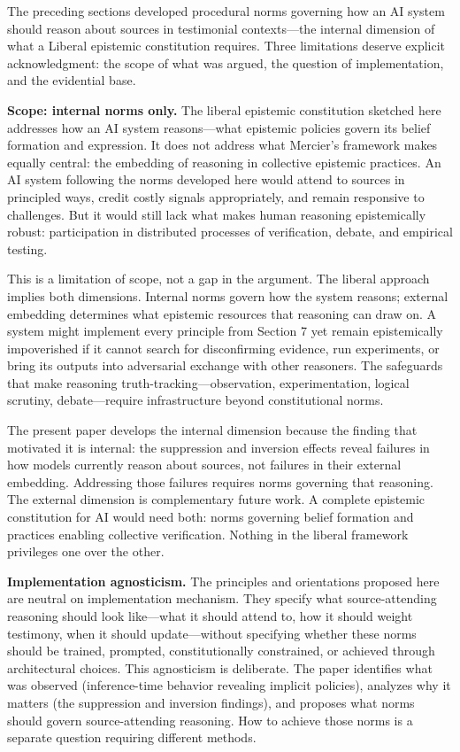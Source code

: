 The preceding sections developed procedural norms governing how an AI
system should reason about sources in testimonial contexts---the
internal dimension of what a Liberal epistemic constitution requires.
Three limitations deserve explicit acknowledgment: the scope of what was
argued, the question of implementation, and the evidential base.

\textbf{Scope: internal norms only.} The liberal epistemic constitution
sketched here addresses how an AI system reasons---what epistemic
policies govern its belief formation and expression. It does not address
what Mercier's framework makes equally central: the embedding of
reasoning in collective epistemic practices. An AI system following the
norms developed here would attend to sources in principled ways, credit
costly signals appropriately, and remain responsive to challenges. But
it would still lack what makes human reasoning epistemically robust:
participation in distributed processes of verification, debate, and
empirical testing.

This is a limitation of scope, not a gap in the argument. The liberal
approach implies both dimensions. Internal norms govern how the system
reasons; external embedding determines what epistemic resources that
reasoning can draw on. A system might implement every principle from
Section 7 yet remain epistemically impoverished if it cannot search for
disconfirming evidence, run experiments, or bring its outputs into
adversarial exchange with other reasoners. The safeguards that make
reasoning truth-tracking---observation, experimentation, logical
scrutiny, debate---require infrastructure beyond constitutional norms.

The present paper develops the internal dimension because the finding
that motivated it is internal: the suppression and inversion effects
reveal failures in how models currently reason about sources, not
failures in their external embedding. Addressing those failures requires
norms governing that reasoning. The external dimension is complementary
future work. A complete epistemic constitution for AI would need both:
norms governing belief formation and practices enabling collective
verification. Nothing in the liberal framework privileges one over the
other.

\textbf{Implementation agnosticism.} The principles and orientations
proposed here are neutral on implementation mechanism. They specify what
source-attending reasoning should look like---what it should attend to,
how it should weight testimony, when it should update---without
specifying whether these norms should be trained, prompted,
constitutionally constrained, or achieved through architectural choices.
This agnosticism is deliberate. The paper identifies what was observed
(inference-time behavior revealing implicit policies), analyzes why it
matters (the suppression and inversion findings), and proposes what
norms should govern source-attending reasoning. How to achieve those
norms is a separate question requiring different methods.

